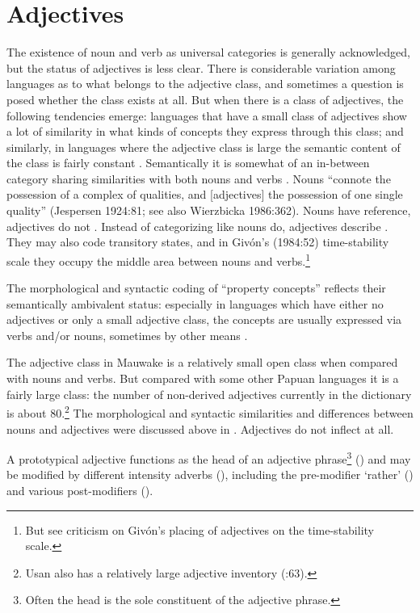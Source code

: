 \section{Adjectives}
{}
The existence of noun and verb as universal categories is generally acknowledged, but the status of adjectives is less clear. There is considerable variation among languages as to what belongs to the adjective class, and sometimes a question is posed whether the class exists at all. But when there is a class of adjectives, the following tendencies emerge: languages that have a small class of adjectives show a lot of similarity in what kinds of concepts they express through this class; and similarly, in languages where the adjective class is large the semantic content of the class is fairly constant \citep[20]{Dixon1977}. Semantically it is somewhat of an in-between category sharing similarities with both nouns and verbs \citep[447]{Lyons1977}. Nouns ``connote the possession of a complex of qualities, and [adjectives] the possession of one single quality'' (Jespersen 1924:81; see also Wierzbicka 1986:362). Nouns have reference, adjectives do not \citep[77]{HakulinenEtAl1979}%
. Instead of categorizing like nouns do, adjectives describe \citep[357]{Wierzbicka1986}. They may also code transitory states, and in Giv\'on's (1984:52) time-stability scale they occupy the middle area between nouns and verbs.\footnote{But see  criticism on Giv\'on's placing of adjectives on the time-stability scale.} 

The morphological and syntactic coding of ``property concepts'' reflects their semantically ambivalent status: especially in languages which have either no adjectives or only a small adjective class, the concepts are usually expressed via verbs and/or nouns, sometimes by other means \citep[20]{Dixon1977}.

The adjective class in Mauwake is a relatively small open class when compared with nouns and verbs. But compared with some other Papuan languages \citep[50--51]{Dixon1977} it is a fairly large class: the number of non-derived adjectives currently in the dictionary is about 80.\footnote{Usan also has a relatively large adjective inventory (:63).} The morphological and syntactic similarities and differences between nouns and adjectives were discussed above in . Adjectives do not inflect at all. 

A prototypical adjective functions as the head of an adjective phrase\footnote{Often the head is the sole constituent of the adjective phrase.} () and may be modified by different intensity adverbs (), including the pre-modifier  `rather' () and various post-modifiers (). 

